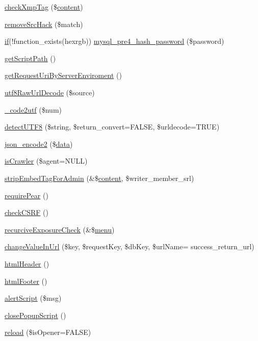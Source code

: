 \begin{DoxyCompactItemize}
\item 
\hyperlink{func_8inc_8php_a2095695afd9791bcab30bc8b53a68046}{check\+Xmp\+Tag} (\$\hyperlink{classcontent}{content})
\item 
\hyperlink{func_8inc_8php_aac01d80c0a850100a25ae023b78e6b7c}{remove\+Src\+Hack} (\$match)
\item 
\hyperlink{menu_2tpl_2js_2jquery_8jstree_8js_acba95bef569cfaee32c4ed0212b2bb92}{if}(!function\+\_\+exists(\textquotesingle{}hexrgb\textquotesingle{})) \hyperlink{func_8inc_8php_a8aaacd0e74786b585aaf170fe505d5f2}{mysql\+\_\+pre4\+\_\+hash\+\_\+password} (\$password)
\item 
\hyperlink{func_8inc_8php_a1086859329d03f8830d51d254c18e47e}{get\+Script\+Path} ()
\item 
\hyperlink{func_8inc_8php_a372c0e65e6e4778fc4e97b1fc3775463}{get\+Request\+Uri\+By\+Server\+Enviroment} ()
\item 
\hyperlink{func_8inc_8php_af1649820887f052ce1f1c9ca623f2db3}{utf8\+Raw\+Url\+Decode} (\$source)
\item 
\hyperlink{func_8inc_8php_a07446b33f4eda53315b12fc1c1b15f5a}{\+\_\+code2utf} (\$num)
\item 
\hyperlink{func_8inc_8php_a97f60adff3c4bbb5a341a557eef742b0}{detect\+U\+T\+F8} (\$string, \$return\+\_\+convert=F\+A\+L\+SE, \$urldecode=T\+R\+UE)
\item 
\hyperlink{func_8inc_8php_a3c49ddc63881e57fc5dd1aa4f923ef0c}{json\+\_\+encode2} (\$\hyperlink{document__category_8js_a94b4f25375ac17cb917012e05bf514a7}{data})
\item 
\hyperlink{func_8inc_8php_a490ffbd4821da1995c76c381553d5b3d}{is\+Crawler} (\$agent=N\+U\+LL)
\item 
\hyperlink{func_8inc_8php_ad6d8ff5f851d62d39b170a46b766d834}{strip\+Embed\+Tag\+For\+Admin} (\&\$\hyperlink{classcontent}{content}, \$writer\+\_\+member\+\_\+srl)
\item 
\hyperlink{func_8inc_8php_ad09c8e07e96c499b4b71d54c2950e704}{require\+Pear} ()
\item 
\hyperlink{func_8inc_8php_a887fd7fe841f5dac3179296ae770172a}{check\+C\+S\+RF} ()
\item 
\hyperlink{func_8inc_8php_a229b3ea7ca966e907d266bc60efa353b}{recurcive\+Exposure\+Check} (\&\$\hyperlink{classmenu}{menu})
\item 
\hyperlink{func_8inc_8php_a2382c81f5a0708850f8790668edcaf90}{change\+Value\+In\+Url} (\$key, \$request\+Key, \$db\+Key, \$url\+Name= \textquotesingle{}success\+\_\+return\+\_\+url\textquotesingle{})
\item 
\hyperlink{func_8inc_8php_adf603cdce37b515631c58bb3acffa614}{html\+Header} ()
\item 
\hyperlink{func_8inc_8php_a2f21eda8628bd378f56529cb680006b0}{html\+Footer} ()
\item 
\hyperlink{func_8inc_8php_acc16be2ad7371ac6478f2314f1248fe2}{alert\+Script} (\$msg)
\item 
\hyperlink{func_8inc_8php_a11562ea030a5d83564d0fbfcfabc8af9}{close\+Popup\+Script} ()
\item 
\hyperlink{func_8inc_8php_aaf78eccbde1406d602a7c408a364be24}{reload} (\$is\+Opener=F\+A\+L\+SE)
\end{DoxyCompactItemize}
